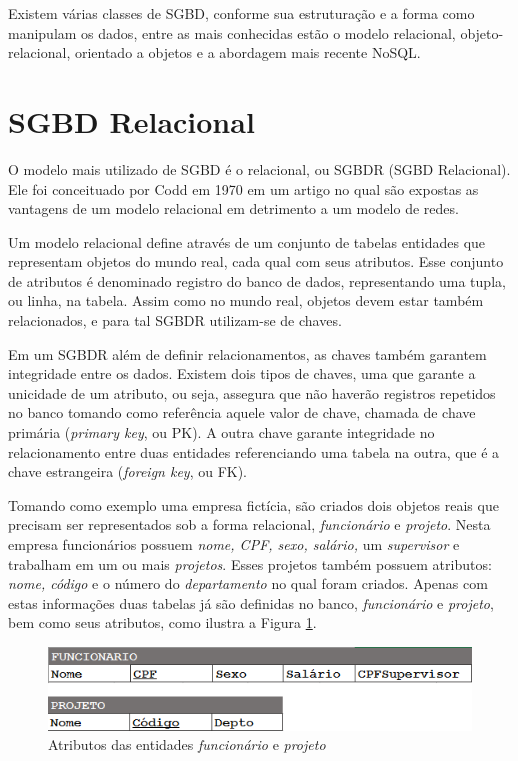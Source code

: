 Existem várias classes de SGBD, conforme sua estruturação e a forma como manipulam os dados, 
entre as mais conhecidas estão o modelo relacional, objeto-relacional, orientado a 
objetos e a abordagem mais recente NoSQL.

\section{SGBD Relacional}

O modelo mais utilizado de SGBD é o relacional, ou SGBDR (SGBD Relacional). Ele foi conceituado por 
Codd \cite{codd1970relational} em 1970 em um artigo no qual são expostas as 
vantagens de um modelo relacional em detrimento a um modelo de redes. 

Um modelo relacional define através de um conjunto de tabelas entidades que representam 
objetos do mundo real, cada qual com seus atributos. Esse conjunto de atributos é 
denominado registro do banco de dados, representando uma tupla, ou linha, na tabela. Assim como no mundo real, 
objetos devem estar também relacionados, e para tal SGBDR utilizam-se de chaves.

Em um SGBDR além de definir relacionamentos, as chaves também garantem integridade entre os dados. 
Existem dois tipos de chaves, uma que garante a unicidade de um atributo, ou seja, assegura que 
não haverão registros repetidos no banco tomando como referência aquele valor de chave, chamada de chave primária (\textit{primary key}, ou PK). A outra chave garante integridade no relacionamento entre duas entidades referenciando uma tabela na outra, que 
é a chave estrangeira (\textit{foreign key}, ou FK).

Tomando como exemplo uma empresa fictícia, são criados dois objetos reais que precisam ser 
representados sob a forma relacional, \textit{funcionário} e \textit{projeto}. Nesta empresa funcionários possuem \textit{nome, 
CPF, sexo, salário,} um \textit{supervisor} e trabalham em um ou mais \textit{projetos}. Esses projetos também possuem atributos: 
\textit{nome, código} e o número do \textit{departamento} no qual foram criados. Apenas com estas informações duas tabelas já são definidas 
no banco, \textit{funcionário} e \textit{projeto}, bem como seus atributos, como ilustra a Figura \ref{fig:func_proj}.

\begin{figure}[htpb]
	\centering
		\includegraphics[width=13cm]{funcionario_projeto}
	\caption{Atributos das entidades \textit{funcionário} e \textit{projeto}}
	\label{fig:func_proj}
\end{figure}

